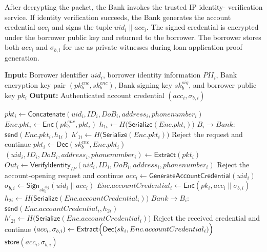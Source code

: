 \documentclass[a4paper,fleqn]{cas-dc}
\begin{document}
After decrypting the packet, the Bank invokes the trusted IP identity- verification service. If identity verification succeeds, the Bank generates the account credential $acc_i$ and signs the tuple $uid_i\parallel acc_i$. The signed credential is encrypted under the borrower public key and returned to the borrower. The borrower stores both $acc_i$ and $\sigma_{b,i}$ for use as private witnesses during loan-application proof generation.

\begin{algorithm*}[t] \caption{Account-Credential Issuance} \label{alg:account_open} \small \textbf{Input:} Borrower identifier $uid_i$, borrower identity information $PII_i$, Bank encryption key pair $(pk_b^{enc},sk_b^{enc})$, Bank signing key $sk_b^{sig}$, and borrower public key $pk_i$ \textbf{Output:} Authenticated account credential $(acc_i,\sigma_{b,i})$ \begin{algorithmic}[1]  \State $pkt_i \leftarrow \mathsf{Concatenate} (uid_i,ID_i,DoB_i,address_i,phonenumber_i)$ \State $Enc.pkt_i \leftarrow \mathsf{Enc}(pk_b^{enc},pkt_i)$ \State $h_{1i} \leftarrow H\bigl(\mathsf{Serialize}(Enc.pkt_i)\bigr)$ \State $B_i\rightarrow Bank$: $\mathsf{send}(Enc.pkt_i,h_{1i})$ \EndFor {} \State $h'_{1i} \leftarrow H\bigl(\mathsf{Serialize}(Enc.pkt_i)\bigr)$  \State Reject the request and continue \EndIf \State $pkt_i \leftarrow \mathsf{Dec}(sk_b^{enc},Enc.pkt_i)$ \State $(uid_i,ID_i,DoB_i,address_i,phonenumber_i) \leftarrow \mathsf{Extract}(pkt_i)$ \State $Out_i \leftarrow \mathsf{VerifyIdentity}_{IP} (uid_i,ID_i,DoB_i,address_i,phonenumber_i)$  \State Reject the account-opening request and continue \EndIf \State $acc_i \leftarrow \mathsf{GenerateAccountCredential}(uid_i)$ \State $\sigma_{b,i} \leftarrow \mathsf{Sign}_{sk_b^{sig}} (uid_i\parallel acc_i)$ \State $Enc.accountCredential_i \leftarrow \mathsf{Enc} (pk_i,acc_i\parallel\sigma_{b,i})$ \State $h_{2i} \leftarrow H\bigl( \mathsf{Serialize}(Enc.accountCredential_i) \bigr)$ \State $Bank\rightarrow B_i$: $\mathsf{send} (Enc.accountCredential_i,h_{2i})$ \State $h'_{2i} \leftarrow H\bigl( \mathsf{Serialize}(Enc.accountCredential_i) \bigr)$  \State Reject the received credential and continue \EndIf \State $(acc_i,\sigma_{b,i}) \leftarrow \mathsf{Extract}\Bigl( \mathsf{Dec} (sk_i,Enc.accountCredential_i) \Bigr)$ \State $\mathsf{store}(acc_i,\sigma_{b,i})$ \EndFor \end{algorithmic} \end{algorithm*}
\end{document}
